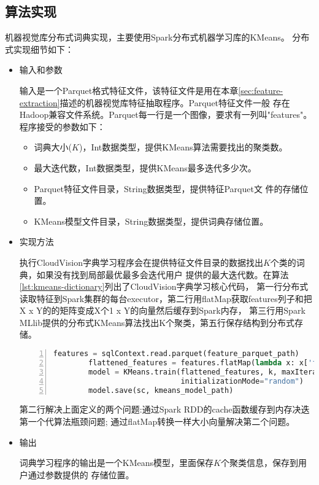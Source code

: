 \subsection*{算法实现}
机器视觉库分布式词典实现，主要使用Spark分布式机器学习库的KMeans。
分布式实现细节如下：
\
\begin{itemize}
  \item 输入和参数

        输入是一个Parquet格式特征文件，该特征文件是用在本章\ref{sec:feature-extraction}描述的机器视觉库特征抽取程序。Parquet特征文件一般
        存在Hadoop兼容文件系统。Parquet每一行是一个图像，要求有一列叫"features"。
        程序接受的参数如下：
        \begin{itemize}
          \item 词典大小($K$)，Int数据类型，提供KMeans算法需要找出的聚类数。
          \item 最大迭代数，Int数据类型，提供KMeans最多迭代多少次。
          \item Parquet特征文件目录，String数据类型，提供特征Parquet文
                件的存储位置。
          \item KMeans模型文件目录，String数据类型，提供词典存储位置。
        \end{itemize}

  \item 实现方法

        执行CloudVision字典学习程序会在提供特征文件目录的数据找出$K$个类的词典，如果没有找到局部最优最多会迭代用户
        提供的最大迭代数。在算法\ref{lst:kmeans-dictionary}列出了CloudVision字典学习核心代码，
        第一行分布式读取特征到Spark集群的每台executor，第二行用flatMap获取features列子和把X x Y的的矩阵变成X个1 x Y的向量然后缓存到Spark内存，
        第三行用Spark MLlib提供的分布式KMeans算法找出K个聚类，第五行保存结构到分布式存储。
        \begin{lstlisting}[language=Python,
                           basicstyle=\small,
                           showstringspaces=false,
                           numbers=left,
                           caption={词典学习核心代码},
                           label={lst:kmeans-dictionary}]
        features = sqlContext.read.parquet(feature_parquet_path)
        flattened_features = features.flatMap(lambda x: x['features']).cache()
        model = KMeans.train(flattened_features, k, maxIterations=maxIter,
                             initializationMode="random")
        model.save(sc, kmeans_model_path)
        \end{lstlisting}
        第二行解决上面定义的两个问题:通过Spark RDD的cache函数缓存到内存决迭第一个代算法瓶颈问题;
        通过flatMap转换一样大小向量解决第二个问题。


  \item 输出

        词典学习程序的输出是一个KMeans模型，里面保存$K$个聚类信息，保存到用户通过参数提供的
        存储位置。
\end{itemize}


